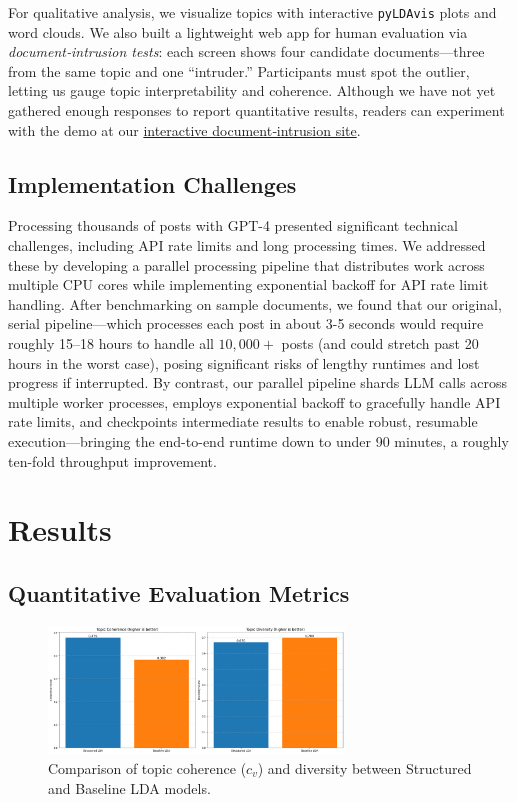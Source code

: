 \documentclass{article}
\begin{document}
For qualitative analysis, we visualize topics with interactive \texttt{pyLDAvis} plots and word clouds.
We also built a lightweight web app for human evaluation via \emph{document‑intrusion tests}: each screen shows four candidate documents—three from the same topic and one “intruder.” Participants must spot the outlier, letting us gauge topic interpretability and coherence.
Although we have not yet gathered enough responses to report quantitative results, readers can experiment with the demo at our \href{https://sammucyo.com/doc-intrusion-test/}{interactive document‑intrusion site}.


\subsection{Implementation Challenges}

Processing thousands of posts with GPT-4 presented significant technical challenges, including API rate limits and long processing times. We addressed these by developing a parallel processing pipeline that distributes work across multiple CPU cores while implementing exponential backoff for API rate limit handling. After benchmarking on sample documents, we found that our original, serial pipeline—which processes each post in about 3-5 seconds would require roughly 15--18 hours to handle all \(10{,}000+\) posts (and could stretch past 20 hours in the worst case), posing significant risks of lengthy runtimes and lost progress if interrupted. By contrast, our parallel pipeline shards LLM calls across multiple worker processes, employs exponential backoff to gracefully handle API rate limits, and checkpoints intermediate results to enable robust, resumable execution—bringing the end-to-end runtime down to under 90 minutes, a roughly ten-fold throughput improvement.


\section{Results}
\subsection{Quantitative Evaluation Metrics}

\begin{figure}[ht]
    \centering
    \includegraphics[width=0.7\textwidth]{plots/coherence_and_diversity_plots.png}
    \caption{Comparison of topic coherence ($c_v$) and diversity between Structured and Baseline LDA models.}
    \label{fig:coherence-diversity}
\end{figure}
\end{document}
